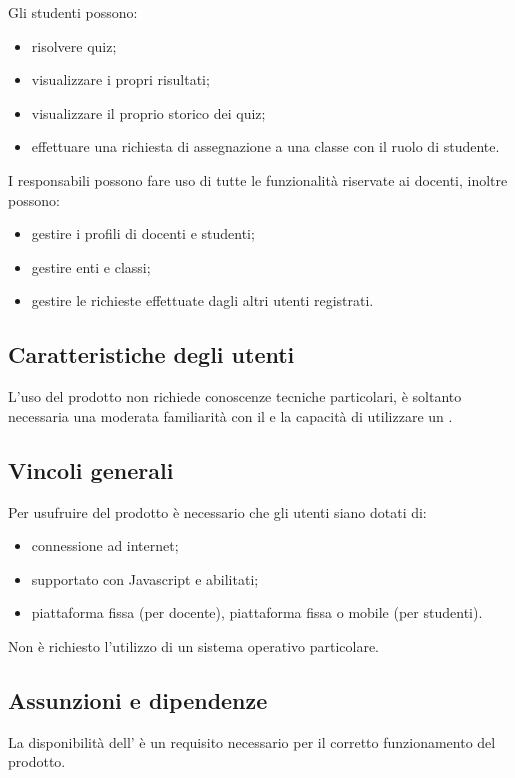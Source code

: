 \documentclass[a4paper, titlepage]{article}
\begin{document}
\bigskip

Gli studenti possono:
\begin{itemize}
\item risolvere quiz;
\item visualizzare i propri risultati;
\item visualizzare il proprio storico dei quiz;
\item effettuare una richiesta di assegnazione a una classe con il ruolo di studente.
\end{itemize}

\bigskip

I responsabili possono fare uso di tutte le funzionalità riservate ai docenti, inoltre possono:
\begin{itemize}
\item gestire i profili di docenti e studenti;
\item gestire enti e classi;
\item gestire le richieste effettuate dagli altri utenti registrati.
\end{itemize}

\subsection{Caratteristiche degli utenti}
L'uso del prodotto non richiede conoscenze tecniche particolari, è soltanto necessaria una moderata familiarità con il  e la capacità di utilizzare un .

\subsection{Vincoli generali}
Per usufruire del prodotto è necessario che gli utenti siano dotati di:
\begin{itemize}
\item connessione ad internet;
\item {} supportato con Javascript e  abilitati;
\item piattaforma fissa (per docente), piattaforma fissa o mobile (per studenti).
\end{itemize}

\bigskip

Non è richiesto l'utilizzo di un sistema operativo particolare.

\subsection{Assunzioni e dipendenze}
La disponibilità dell' è un requisito necessario per il corretto funzionamento del prodotto.
\end{document}
